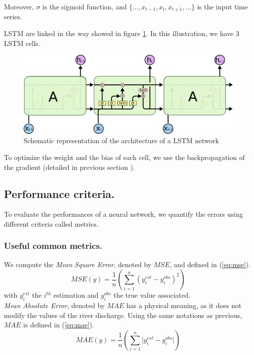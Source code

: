 Moreover, $\sigma$ is the sigmoid function, and $\{..., x_{t-1}, x_t, x_{t+1}, ... \}$ is the input time series.\newline

LSTM are linked in the way showed in figure \ref{fig:schema lstm}. In this illustration, we have 3 LSTM cells. 

\begin{figure}[H]
    \centering
    \includegraphics{Graph/schema_lstm.png}
    \caption{Schematic representation of the architecture of a LSTM network \cite{lstm-cell-linked}}
    \label{fig:schema lstm}
\end{figure}

To optimize the weight and the bias of each cell, we use the backpropagation of the gradient (detailed in previous section ).

\subsection{Performance criteria. \label{metrics}} To evaluate the performances of a neural network, we quantify the errors using different criteria called metrics. 

\subsubsection{Useful common metrics.\label{section321}}
 We compute the \textit{Mean Square Error}, denoted by $MSE$, and defined in (\ref{eq:mse}).
\begin{equation}
    MSE(y) = {\frac{1}{n} \left( \sum^n_{i=1}(y^{est}_i - y^{obs}_i)^2 \right)}
    \label{eq:mse}
\end{equation}
with $y^{est}_i$ the $i^{th}$ estimation and $y^{obs}_i$ the true value associated.\\

\textit{Mean Absolute Error}, denoted by $MAE$ has a physical meaning, as it does not modify the values of the river discharge. Using the same notations as previous, $MAE$ is defined in (\ref{eq:mae}).
\begin{equation}
    MAE(y) = {\frac{1}{n} \left( \sum^n_{i=1}\lvert y^{est}_i - y^{obs}_i\rvert \right)}
    \label{eq:mae}
\end{equation}

